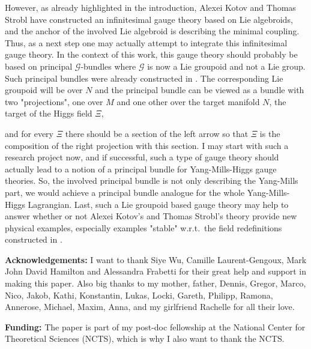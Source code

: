 \documentclass[a4paper,oneside,11pt,bibliography=totoc]{scrartcl}
\theoremstyle{plain}
\theoremstyle{remark}
\theoremstyle{definition}
\begin{document}
However, as already highlighted in the introduction, Alexei Kotov and Thomas Strobl have constructed an infinitesimal gauge theory based on Lie algebroids, and the anchor of the involved Lie algebroid is describing the minimal coupling. Thus, as a next step one may actually attempt to integrate this infinitesimal gauge theory. In the context of this work, this gauge theory should probably be based on principal $\mathcal{G}$-bundles where $\mathcal{G}$ is now a Lie groupoid and not a Lie group. Such principal bundles were already constructed in \cite[beginning of \S 5.7, page 144f.]{GroupoidBasedPrincipalBundles}. The corresponding Lie groupoid will be over $N$ and the principal bundle can be viewed as a bundle with two "projections", one over $M$ and one other over the target manifold $N$, the target of the Higgs field $\Xi$,

\begin{center}
\end{center}

and for every $\Xi$ there should be a section of the left arrow so that $\Xi$ is the composition of the right projection with this section.
I may start with such a research project now, and if successful, such a type of gauge theory should actually lead to a notion of a principal bundle for Yang-Mills-Higgs gauge theories. So, the involved principal bundle is not only describing the Yang-Mills part, we would achieve a principal bundle analogue for the whole Yang-Mills-Higgs Lagrangian. Last, such a Lie groupoid based gauge theory may help to answer whether or not Alexei Kotov's and Thomas Strobl's theory provide new physical examples, especially examples "stable" w.r.t.\ the field redefinitions constructed in \cite{MyThesis}.

\textbf{Acknowledgements:} I want to thank Siye Wu, Camille Laurent-Gengoux, Mark John David Hamilton and Alessandra Frabetti for their great help and support in making this paper. Also big thanks to my mother, father, Dennis, Gregor, Marco, Nico, Jakob, Kathi, Konstantin, Lukas, Locki, Gareth, Philipp, Ramona, Annerose, Michael, Maxim, Anna, and my girlfriend Rachelle for all their love.

\textbf{Funding:} The paper is part of my post-doc fellowship at the National Center for Theoretical Sciences (NCTS), which is why I also want to thank the NCTS.
\end{document}
